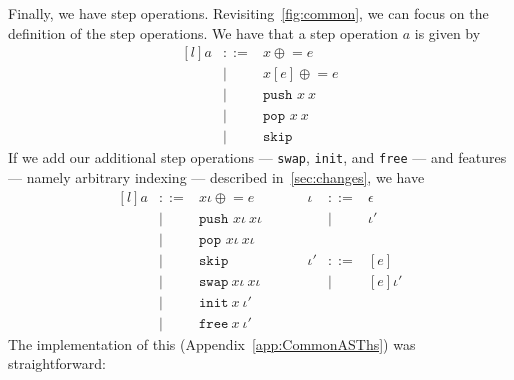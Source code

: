 Finally, we have step operations. Revisiting~\ref{fig:common}, we can focus on the definition of the step operations. We have that a step operation $a$ is given by
\[
\begin{matrix*}[l]
  {a} & ::= & {x}\mathrel{\oplus}= e \\
             &  |  & {x}[ e]\mathrel{\oplus}= e \\
             &  |  & \texttt{push }{x}\ {x} \\
             &  |  & \texttt{pop  }{x}\ {x} \\
             &  |  & \texttt{skip}
\end{matrix*}
\]
If we add our additional step operations --- \texttt{swap}, \texttt{init}, and \texttt{free} --- and features --- namely arbitrary indexing --- described in~\ref{sec:changes}, we have
\[
\begin{matrix*}[l]
  {a} & ::= & {x}\iota\mathrel{\oplus}= e       \quad\quad\quad  & \iota  & ::= & \epsilon \\
      &  |  & \texttt{push }{x}\iota \ {x}\iota                   &        & |   & \iota' \\
      &  |  & \texttt{pop  }{x}\iota \ {x}\iota \\
      &  |  & \texttt{skip}                                      & \iota' & ::= & [e] \\
      &  |  & \texttt{swap} \ x\iota \ x\iota                    &        & |   & [e]\iota' \\
      &  |  & \texttt{init} \ x \ \iota' \\
      &  |  & \texttt{free} \ x \ \iota'
\end{matrix*}
\]
The implementation of this (Appendix~\ref{app:CommonASThs}) was straightforward:



